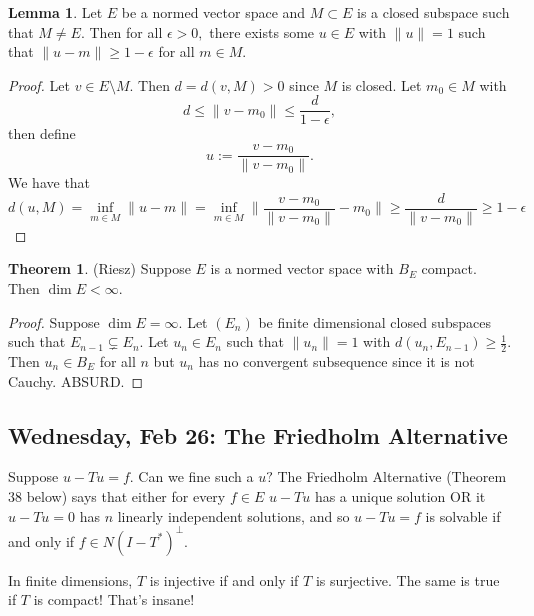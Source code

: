 \documentclass[10pt, oneside]{article}
\theoremstyle{definition}
\newtheorem{thm}{Theorem}
\newtheorem{lem}{Lemma}
\begin{document}
\begin{lem}
    Let $E$ be a normed vector space and $M\subset E$ is a closed subspace such that $M\neq E.$ Then for all $\epsilon>0,$ there exists some $u\in E$ with $\|u\| = 1$ such that $\|u - m\| \geq 1-\epsilon$ for all $m \in M.$
\end{lem}
\begin{proof}
    Let $v \in E\setminus M.$ Then $d = d(v,M) >0$ since $M$ is closed. Let $m_0 \in M$ with 
    \[d \leq \|v -m_0\| \leq \frac{d}{1-\epsilon},\] then define 
    \[u := \frac{v - m_0}{\|v - m_0\|}.\] We have that 
    \[d(u, M) = \inf_{m \in M}\|u-m\| = \inf_{m \in M}\|\frac{v - m_0}{\|v - m_0\|} - m_0\| \geq \frac{d}{\|v - m_0\|}  \geq 1 - \epsilon\]
\end{proof}

\begin{thm}
    (Riesz) Suppose $E$ is a normed vector space with $B_E$ compact. Then $\dim E < \infty.$ 
\end{thm}
\begin{proof}
    Suppose $\dim E = \infty.$ Let $(E_n)$ be finite dimensional closed subspaces such that $E_{n-1}\subsetneq E_n.$ Let $u_n \in E_n$ such that $\|u_n\| = 1$ with $d(u_n, E_{n-1}) \geq \frac{1}{2}.$ Then $u_n \in B_E$ for all $n$ but $u_n$ has no convergent subsequence since it is not Cauchy. ABSURD. 
\end{proof}

\newpage
\subsection{Wednesday, Feb 26: The Friedholm Alternative}
Suppose $u - Tu = f.$ Can we fine such a $u?$ The Friedholm Alternative (Theorem 38 below) says that either for every $f\in E$ $u - Tu$ has a unique solution OR it $u- Tu = 0$ has $n$ linearly independent solutions, and so $u - Tu = f$ is solvable if and only if $f \in N(I - T^*)^\perp.$ 

In finite dimensions, $T$ is injective if and only if $T$ is surjective. The same is true if $T$ is compact! That's insane! 
\end{document}
